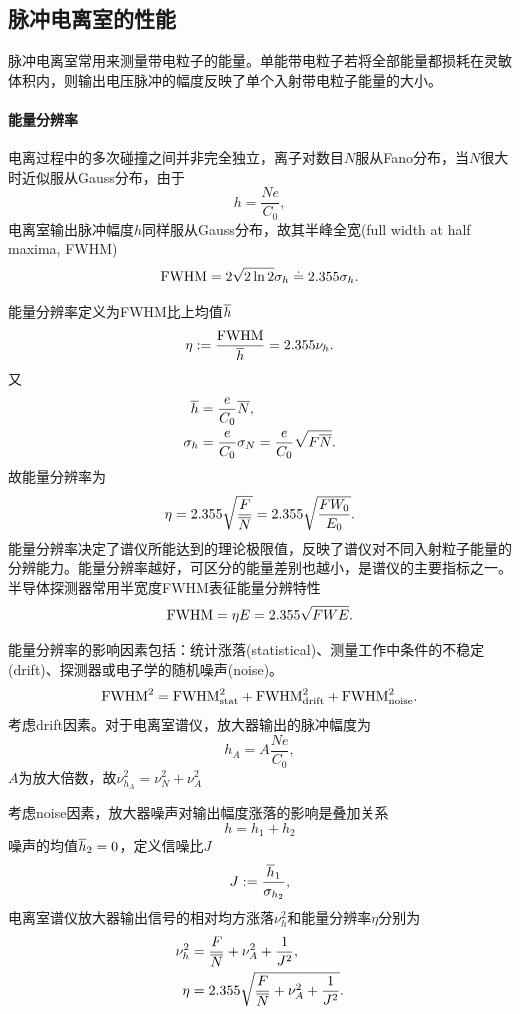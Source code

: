 \subsection{脉冲电离室的性能}

脉冲电离室常用来测量带电粒子的能量。单能带电粒子若将全部能量都损耗在灵敏体积内，则输出电压脉冲的幅度反映了单个入射带电粒子能量的大小。
\paragraph{能量分辨率}
电离过程中的多次碰撞之间并非完全独立，离子对数目$N$服从Fano分布，当$N$很大时近似服从Gauss分布，由于
\[
	h = \frac{Ne}{C_0},
\]
电离室输出脉冲幅度$h$同样服从Gauss分布，故其半峰全宽(full width at half maxima, FWHM)
\begin{equation}\label{eq:nrd-gaussian-fwhm}
	\mathrm{FWHM} = 2\sqrt{2\ln2}\sigma_h \doteq 2.355\sigma_h.
\end{equation}

能量分辨率定义为FWHM比上均值$\overline{h}$
\begin{equation}\label{eq:nrd-energy-resolution}
	\eta := \frac{\mathrm{FWHM}}{\overline{h}} = 2.355\nu_h.
\end{equation}
又
\begin{align*}
	\overline{h} &= \frac e{C_0}\overline{N},\\
	\sigma_h &= \frac e{C_0}\sigma_N = \frac e{C_0}\sqrt{F\overline{N}}.
\end{align*}
故能量分辨率为
\begin{align}
	\eta = 2.355\sqrt{\frac{F}{\overline{N}}} = 2.355\sqrt{\frac{FW_0}{E_0}}.
\end{align}
能量分辨率决定了谱仪所能达到的理论极限值，反映了谱仪对不同入射粒子能量的分辨能力。能量分辨率越好，可区分的能量差别也越小，是谱仪的主要指标之一。半导体探测器常用半宽度FWHM表征能量分辨特性
\[
	\mathrm{FWHM} = \eta E = 2.355\sqrt{FWE}.
\]

能量分辨率的影响因素包括：统计涨落(statistical)、测量工作中条件的不稳定(drift)、探测器或电子学的随机噪声(noise)。
\begin{equation}\label{eq:nrd-independent-linewidths}
	\mathrm{FWHM}^2 = \mathrm{FWHM}_{\mathrm{stat}}^2 + \mathrm{FWHM}_{\mathrm{drift}}^2 + \mathrm{FWHM}_{\mathrm{noise}}^2.
\end{equation}
考虑drift因素。对于电离室谱仪，放大器输出的脉冲幅度为
\[
	h_A = A\frac{Ne}{C_0},
\]
$A$为放大倍数，故$\nu_{h_A}^2 = \nu_N^2 + \nu_A^2$

考虑noise因素，放大器噪声对输出幅度涨落的影响是叠加关系
\[
	h = h_1 + h_2
\]
噪声的均值$\overline{h}_2 = 0$，定义信噪比$J$
\begin{equation}\label{eq:nrd-signal-to-noise-ratio}
	J := \frac{\overline{h}_1}{\sigma_{h_2}},
\end{equation}
电离室谱仪放大器输出信号的相对均方涨落$\nu_h^2$和能量分辨率$\eta$分别为
\begin{subequations}\label{eq:nrd-ion-chamber-resolution}
	\begin{align}
		\nu_h^2 &= \frac F{\overline{N}} + \nu_A^2 + \frac1{J^2},\\
		\eta &= 2.355\sqrt{\frac F{\overline{N}} + \nu_A^2 + \frac1{J^2}}.
	\end{align}
\end{subequations}
